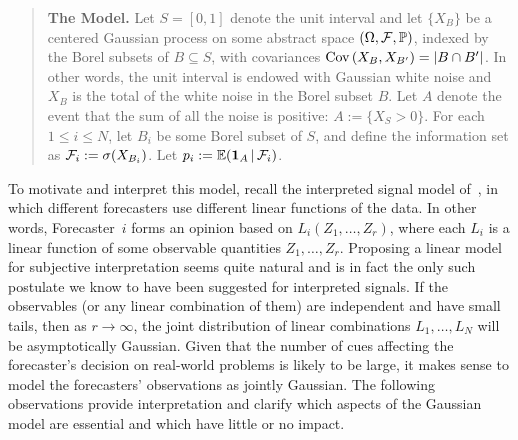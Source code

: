 \documentclass[11pt]{article}
\renewcommand{\P}{\mathbb{P}}
\newcommand{\E}{\mathbb{E}}
\theoremstyle{definition}
\theoremstyle{definition}
\def\one{{\bf 1}}
\def\F{{\cal F}}
\def\P{{\mathbb P}}
\def\E{{\mathbb E}}
\def\Cov{{\rm Cov}\,}
\def\|{\, | \,}
\begin{document}
\begin{quote}
{\bf The Model.} Let $S = [0,1]$ denote the unit interval and let $\{
X_B \}$ be a centered Gaussian process on some abstract space $(\Omega
, \F , \P)$, indexed by the Borel subsets of $B \subseteq S$, with
covariances $\Cov (X_B , X_{B'}) = |B \cap B'|$.  In other words, the
unit interval is endowed with Gaussian white noise and $X_B$ is the
total of the white noise in the Borel subset $B$.  Let $A$ denote the
event that the sum of all the noise is positive: $A := \{ X_S > 0 \}$.
For each $1 \leq i \leq N$, let $B_i$ be some Borel subset of $S$, and
define the information set as $\F_i := \sigma (X_{B_i})$.  Let $p_i :=
\E (\one_A \| \F_i)$.
\end{quote}

To motivate and interpret this model, recall the interpreted signal
model of~\citet{broomell2009experts}, in which different forecasters
use different linear functions of the data.  In other words,
Forecaster~$i$ forms an opinion based on $L_i (Z_1 , \ldots , Z_r)$,
where each $L_i$ is a linear function of some observable quantities
$Z_1 , \ldots , Z_r$.  Proposing a linear model for subjective
interpretation seems quite natural and is in fact the only such
postulate we know to have been suggested for interpreted signals.  If
the observables (or any linear combination of them) are independent
and have small tails, then as $r \to \infty$, the joint distribution
of linear combinations $L_1 , \ldots , L_N$ will be asymptotically
Gaussian.  Given that the number of cues affecting the forecaster's
decision on real-world problems is likely to be large, it makes sense
to model the forecasters' observations as jointly Gaussian.  The
following observations provide interpretation and clarify which
aspects of the Gaussian model are essential and which have little or
no impact.
\end{document}
